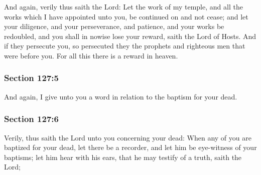 		And again, verily thus saith the Lord: Let the work of my temple, and all the works which I have appointed unto you, be continued on and not cease; and let your diligence, and your perseverance, and patience, and your works be redoubled, and you shall in nowise lose your reward, saith the Lord of Hosts.  And if they persecute you, so persecuted they the prophets and righteous men that were before you.  For all this there is a reward in heaven.


	\subsubsection{Section 127:5} %
		\label{DC127-5}

		And again, I give unto you a word in relation to the baptism for your dead.


	\subsubsection{Section 127:6} %
		\label{DC127-6}

		Verily, thus saith the Lord unto you concerning your dead: When any of you are baptized for your dead, let there be a recorder, and let him be eye-witness of your baptisms; let him hear with his ears, that he may testify of a truth, saith the Lord;


